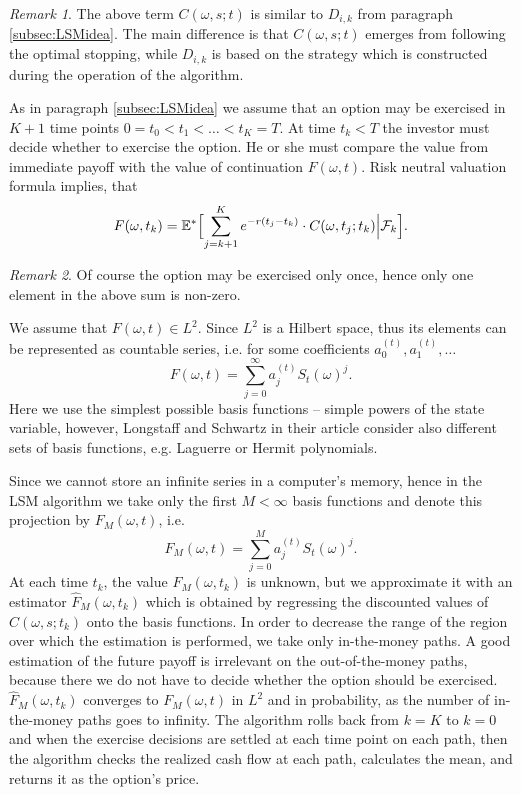 \documentclass[a4paper,11pt, twoside]{book}
\theoremstyle{definition}
\theoremstyle{remark}
\newtheorem{remark}{Remark}[chapter]
\def\Em{{\mathbb{E}^*}}
\def\Bpipe{{\Bigl|\Bigr.}}
\begin{document}
\begin{remark}
 The above term $C(\omega, s; t)$ is similar to $D_{i,k}$ from paragraph \ref{subsec:LSMidea}. The main difference is that $C(\omega, s; t)$ emerges from following the optimal stopping, while $D_{i,k}$ is based on the strategy which is constructed during the operation of the algorithm.
\end{remark}
As in paragraph \ref{subsec:LSMidea} we assume that an option may be exercised in $K+1$ time points $0 = t_0 < t_1 < \ldots < t_K  = T$. At time $t_k < T$ the investor must decide whether to exercise the option. He or she must compare the value from immediate payoff with the value of continuation $F(\omega, t)$. Risk neutral valuation formula implies, that
\[ F(\omega, t_k) = \Em \Bigl[ \sum\limits_{j=k+1}^K e^{-r(t_j - t_k)}\cdot C(\omega, t_j; t_k) \Bpipe \mathcal{F}_k \Bigl]. \] 
\begin{remark}
 Of course the option may be exercised only once, hence only one element in the above sum is non-zero.
\end{remark}
We assume that $F(\omega, t) \in L^2$. Since $L^2$ is a Hilbert space, thus its elements can be represented as countable series, i.e. for some coefficients $a_0^{(t)},a_1^{(t)},\ldots$
\[ F(\omega, t) = \sum\limits_{j=0}^{\infty} a_j^{(t)} S_t(\omega)^j. \]
Here we use the simplest possible basis functions -- simple powers of the state variable, however, Longstaff and Schwartz in their article consider also different sets of basis functions, e.g. Laguerre or Hermit polynomials.

Since we cannot store an infinite series in a computer's memory, hence in the LSM algorithm we take only the first $M < \infty$ basis functions and denote this projection by $F_M(\omega, t)$, i.e.
\[ F_M(\omega, t) = \sum\limits_{j=0}^{M} a_j^{(t)} S_t(\omega)^j. \]
At each time $t_k$, the value $F_M(\omega, t_k)$ is unknown, but we approximate it with an estimator $\hat{F}_M(\omega, t_k)$ which is obtained by regressing the discounted values of $C(\omega, s; t_k)$ onto the basis functions.
In order to decrease the range of the region over which the estimation is performed, we take only in-the-money paths. A good estimation of the future payoff is irrelevant on the out-of-the-money paths, because there we do not have to decide whether the option should be exercised. $\hat{F}_M(\omega, t_k)$ converges to $F_M(\omega, t)$ in $L^2$ and in probability, as the number of in-the-money paths goes to infinity.
The algorithm rolls back from $k=K$ to $k=0$ and when the exercise decisions are settled at each time point on each path, then the algorithm checks the realized cash flow at each path, calculates the mean, and returns it as the option's price.
\end{document}
